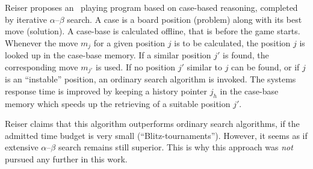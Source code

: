 Reiser \cite{Reiser94} proposes an \Abalone\ playing program based on case-based reasoning, completed by iterative $\alpha$--$\beta$ search. A case is a board position (problem) along with its best move (solution). A case-base is calculated offline, that is before the game starts. Whenever the move $m_j$ for a given position $j$ is to be calculated, the position $j$ is looked up in the case-base memory. If a similar position $j'$ is found, the corresponding move $m_{j'}$ is used. If no position $j'$ similar to $j$ can be found, or if $j$ is an ``instable'' position, an ordinary search algorithm is invoked. The systems response time is improved by keeping a history pointer $j_h$ in the case-base memory which speeds up the retrieving of a suitable position $j'$.

Reiser claims that this algorithm outperforms ordinary search algorithms, if the admitted time budget is very small (``Blitz-tournaments''). However, it seems as if extensive $\alpha$--$\beta$ search remains still superior. This is why this approach was \emph{not} pursued any further in this work.

